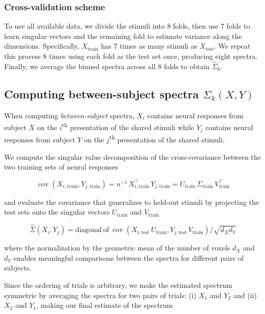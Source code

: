 \documentclass[10pt]{article}
\begin{document}
\subsubsection{Cross-validation scheme}\label{cross-validation-scheme}

To use all available data, we divide the stimuli into 8 folds, then use
7 folds to learn singular vectors and the remaining fold to estimate
variance along the dimensions. Specifically, \(X_\text{train}\) has 7
times as many stimuli as \(X_\text{test}\). We repeat this process 8
times using each fold as the test set once, producing eight spectra.
Finally, we average the binned spectra across all 8 folds to obtain
\(\hat{\Sigma}_k\).

\subsection{\texorpdfstring{Computing between-subject spectra
\(\Sigma_k(X,Y)\)}{Computing between-subject spectra \textbackslash Sigma\_k(X,Y)}}\label{computing-between-subject-spectra-sigma_kxy}

When computing \emph{between-subject} spectra, \(X_i\) contains neural
responses from subject \(X\) on the \(i\)\textsuperscript{th}
presentation of the shared stimuli while \(Y_j\) contains neural
responses from subject \(Y\) on the \(j\)\textsuperscript{th}
presentation of the shared stimuli.

We compute the singular value decomposition of the cross-covariance
between the two training sets of neural responses

\[
\operatorname{cov}
\left(X_{i,\text{train}} , Y_{j,\text{train}}\right)
= n^{-1}\,X_{i,\text{train}}^\top\,Y_{j,\text{train}}
= U_\text{train}\, \Sigma_\text{train}\, V_\text{train}^\top
\]

and evaluate the covariance that generalizes to held-out stimuli by
projecting the test sets onto the singular vectors \(U_\text{train}\)
and \(V_\text{train}\)

\[
\hat{\Sigma}(X_i,Y_j) = \mathrm{diagonal~of~} \operatorname{cov}
\left(X_{i, \text{test}}\, U_\text{train} , Y_{j, \text{test}}\, V_\text{train} \right) / \sqrt{d_X d_Y}
\]

where the normalization by the geometric mean of the number of voxels
\(d_X\) and \(d_Y\) enables meaningful comparisons between the spectra
for different pairs of subjects.

Since the ordering of trials is arbitrary, we make the estimated
spectrum symmetric by averaging the spectra for two pairs of trials: (i)
\(X_1\) and \(Y_2\) and (ii) \(X_2\) and \(Y_1\), making our final
estimate of the spectrum
\end{document}
